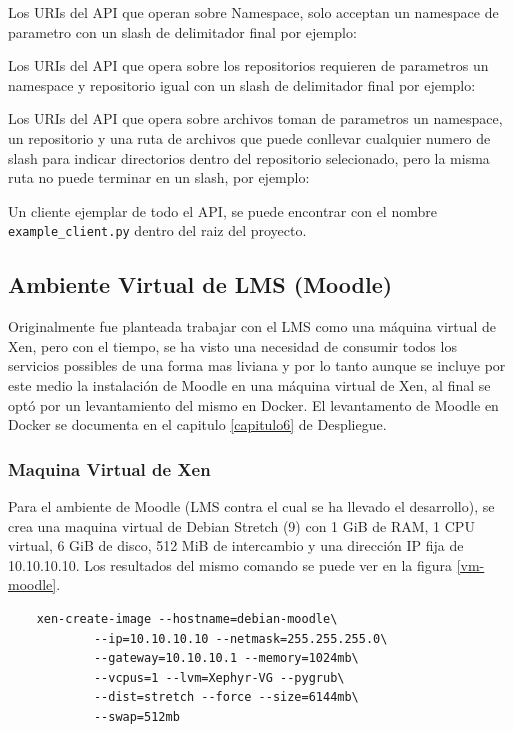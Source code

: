 Los URIs del API que operan sobre Namespace, solo acceptan un namespace de parametro con un slash de delimitador final por ejemplo: %

Los URIs del API que opera sobre los repositorios requieren de parametros un namespace y repositorio igual con un slash de delimitador final por ejemplo: %

Los URIs del API que opera sobre archivos toman de parametros un namespace, un repositorio y una ruta de archivos que puede conllevar cualquier numero de slash para indicar directorios dentro del repositorio selecionado, pero la misma ruta no puede terminar en un slash, por ejemplo: %

Un cliente ejemplar de todo el API, se puede encontrar con el nombre \texttt{example\_client.py} dentro del raiz del proyecto.

 
\subsection{Ambiente Virtual de LMS  (Moodle)}
\label{instalacion-moodle}
Originalmente fue planteada trabajar con el LMS como una máquina virtual de Xen, pero con el tiempo, se ha visto una necesidad de consumir todos los servicios possibles de una forma mas liviana y por lo tanto aunque se incluye por este medio la instalación de Moodle en una máquina virtual de Xen, al final se optó por un levantamiento del mismo en Docker. El levantamento de Moodle en Docker se documenta en el capitulo \ref{capitulo6} de Despliegue.

\subsubsection{Maquina Virtual de Xen}
Para el ambiente de Moodle (LMS  contra el cual se ha llevado el desarrollo), se crea una maquina virtual de Debian Stretch (9) con 1 GiB de RAM, 1 CPU virtual, 6 GiB de disco, 512 MiB de intercambio y una dirección IP fija de 10.10.10.10. Los resultados del mismo comando se puede ver en la figura \ref{vm-moodle}.
\begin{lstlisting}
	xen-create-image --hostname=debian-moodle\
    		--ip=10.10.10.10 --netmask=255.255.255.0\
        	--gateway=10.10.10.1 --memory=1024mb\
        	--vcpus=1 --lvm=Xephyr-VG --pygrub\
        	--dist=stretch --force --size=6144mb\
        	--swap=512mb
\end{lstlisting}

